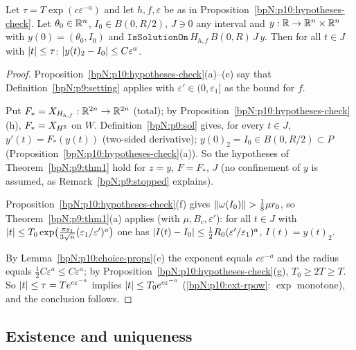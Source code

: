 \begin{proposition}\label{bpN:p10:confinement}
Let $\tau=T\exp(c\varepsilon^{-a})$ and let $h,f,\varepsilon$ be as in Proposition~\ref{bpN:p10:hypotheses-check}. Let $\theta_0\in\mathbb{R}^n$, $I_0\in B(0,R/2)$, $J\ni0$ any interval and $y:\mathbb{R}\to\mathbb{R}^n\times\mathbb{R}^n$ with $y(0)=(\theta_0,I_0)$ and
$\texttt{IsSolutionOn}\,H_{h,f}\,B(0,R)\,J\,y$. Then for all $t\in J$ with $\lvert t\rvert\le\tau$: $\lvert y(t)_2-I_0\rvert\le C\varepsilon^a$.
\end{proposition}
\begin{proof}
\label{stepN:p10:cf-setting} Proposition~\ref{bpN:p10:hypotheses-check}(a)--(e) say that Definition~\ref{bpN:p9:setting} applies with $\varepsilon'\in(0,\varepsilon_1]$ as the bound for $f$.

\label{stepN:p10:cf-orbit} Put $F_*=X_{H_{h,f}}:\mathbb{R}^{2n}\to\mathbb{R}^{2n}$ (total); by Proposition~\ref{bpN:p10:hypotheses-check}(h), $F_*=X_{H^{\mathbb{R}}}$ on $W$. Definition~\ref{bpN:p0:sol} gives, for every $t\in J$, $y'(t)=F_*(y(t))$ (two-sided derivative); $y(0)_2=I_0\in B(0,R/2)\subset P$ (Proposition~\ref{bpN:p10:hypotheses-check}(a)). So the hypotheses of Theorem~\ref{bpN:p9:thm1} hold for $z=y$, $F=F_*$, $J$ (no confinement of $y$ is assumed, as Remark~\ref{bpN:p9:stopped} explains).

\label{stepN:p10:cf-branch} Proposition~\ref{bpN:p10:hypotheses-check}(f) gives $\lVert \omega(I_0)\rVert>\frac18\mu r_0$, so Theorem~\ref{bpN:p9:thm1}(a) applies (with $\mu,B_c,\varepsilon'$): for all $t\in J$ with $\lvert t\rvert\le T_0\exp\bigl(\frac{\pi s_1}{3\sqrt n}(\varepsilon_1/\varepsilon')^a\bigr)$ one has $\lvert I(t)-I_0\rvert\le\frac12R_0(\varepsilon'/\varepsilon_1)^a$, $I(t)=y(t)_2$.

\label{stepN:p10:cf-trans} By Lemma~\ref{bpN:p10:choice-props}(c) the exponent equals $c\varepsilon^{-a}$ and the radius equals $\frac12C\varepsilon^a\le C\varepsilon^a$; by Proposition~\ref{bpN:p10:hypotheses-check}(g), $T_0\ge2T\ge T$. So $\lvert t\rvert\le\tau=Te^{c\varepsilon^{-a}}$ implies $\lvert t\rvert\le T_0e^{c\varepsilon^{-a}}$ (\ref{bpN:p10:ext-rpow}: $\exp$ monotone), and the conclusion follows.
\end{proof}

\subsection{Existence and uniqueness}\label{bpN:p10:s-exist}

